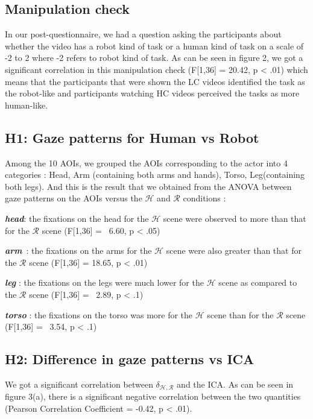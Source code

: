 \documentclass{acm_proc_article-sp}
\begin{document}
\subsection{Manipulation check}

In our post-questionnaire, we had a question asking the participants about
whether the video has a robot kind of task or a human kind of task on a scale of
-2 to 2 where -2 refers to robot kind of task. As can be seen in figure 2, we
got a significant correlation in this manipulation check (F[1,36] = 20.42, p <
.01) which means that the participants that were shown the LC videos identified
the task as the robot-like and participants watching HC videos perceived the
tasks as more human-like. 




\subsection{H1: Gaze patterns for Human vs Robot}

Among the 10 AOIs, we grouped the AOIs corresponding to the actor into 4
categories : Head, Arm (containing both arms and hands), Torso, Leg(containing
both legs). And this is the result that we obtained from the ANOVA between gaze
patterns on the AOIs versus the $\mathcal{H}$ and $\mathcal{R}$ conditions :

\textit{\textbf{head}}: the fixations on the head for the $\mathcal{H}$ scene
were observed to more than that for the $\mathcal{R}$ scene (F[1,36] = \ 6.60, p
< .05)

\textit{\textbf{arm}}\ : the fixations on the arms for the $\mathcal{H}$ scene
were also greater than that for the $\mathcal{R}$ scene (F[1,36] = 18.65, p <
.01)

\textit{\textbf{leg}}\hspace{0.18cm} : the fixations on the legs were much lower
for the $\mathcal{H}$ scene as compared to the $\mathcal{R}$ scene (F[1,36] = \
2.89, p < .1)

\textit{\textbf{torso}} : the fixations on the torso was more for the
$\mathcal{H}$ scene than for the $\mathcal{R}$ scene (F[1,36] = \ 3.54, p < .1) 

\subsection{H2: Difference in gaze patterns vs ICA}

We got a significant correlation between $\delta_{\mathcal{H},\mathcal{R}}$ and
the ICA. As can be seen in figure 3(a), there is a significant negative
correlation between the two quantities (Pearson Correlation Coefficient = -0.42,
p < .01).
\end{document}
